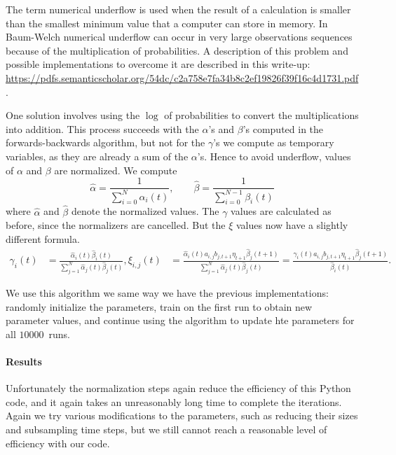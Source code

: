 \documentclass[twoside]{article}
\begin{document}
The term numerical underflow is used when the result of a calculation is smaller than the smallest minimum value that a computer can store in memory.
In Baum-Welch numerical underflow can occur in very large observations sequences because of the multiplication of probabilities.
A description of this problem and possible implementations to overcome it are described in this write-up: {\footnotesize\url{https://pdfs.semanticscholar.org/54dc/c2a758e7fa34b8c2ef19826f39f16c4d1731.pdf}}.

One solution involves using the $\log$ of probabilities to convert the multiplications into addition.
This process succeeds with the $\alpha$'s and $\beta$'s computed in the forwards-backwards algorithm, but not for the $\gamma$'s we compute as temporary variables, as they are already a sum of the $\alpha$'s.
Hence to avoid underflow, values of $\alpha$ and $\beta$ are normalized.
We compute
\begin{equation*}
  \hat{\alpha} = \frac{1}{\sum_{i=0}^N \alpha_i(t)}, \qquad \hat{\beta} = \frac{1}{\sum_{i=0}^{N-1}\beta_i(t)}
\end{equation*}
where $\hat{\alpha}$ and $\hat{\beta}$ denote the normalized values.
The $\gamma$ values are calculated as before, since the normalizers are cancelled.
But the $\xi$ values now have a slightly different formula.
\begin{align*}
  \gamma_i(t) &= \frac{\hat{\alpha}_i(t) \hat{\beta}_i(t)}{\sum_{j=1}^N \hat{\alpha}_j(t) \hat{\beta}_j(t)},
  \xi_{i, j}(t) &= \frac{\hat{\alpha}_i(t) a_{i, j} b_{j, t+1} \eta_{t+1} \hat{\beta}_{j}(t+1)}{\sum_{j=1}^N \hat{\alpha}_j(t) \hat{\beta}_j(t)} = \frac{\gamma_i(t) a_{i, j} b_{j, t+1} \eta_{t+1} \hat{\beta}_j(t+1)}{\hat{\beta}_i(t)}.
\end{align*}

We use this algorithm we same way we have the previous implementations: randomly initialize the parameters, train on the first run to obtain new parameter values, and continue using the algorithm to update hte parameters for all $\num{10000}$~runs.

\paragraph{Results}

Unfortunately the normalization steps again reduce the efficiency of this Python code, and it again takes an unreasonably long time to complete the iterations.
Again we try various modifications to the parameters, such as reducing their sizes and subsampling time steps, but we still cannot reach a reasonable level of efficiency with our code.
\end{document}
